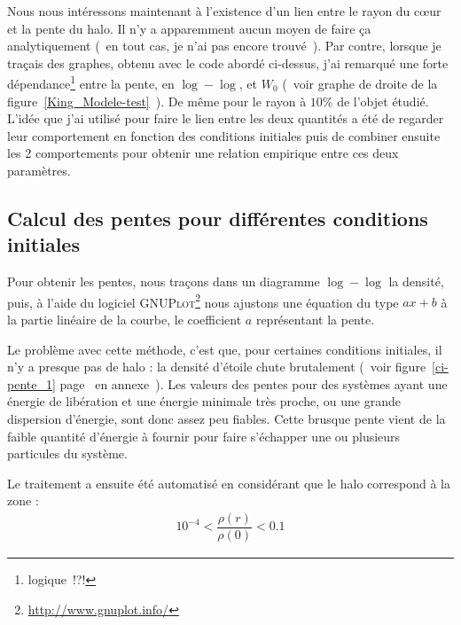 	Nous nous intéressons maintenant à l'existence d'un lien entre le rayon du cœur et la pente
du halo. Il n'y a apparemment aucun moyen de faire ça analytiquement (~en tout cas, je n'ai pas encore trouvé~).
Par contre, lorsque je traçais des graphes, obtenu avec le code abordé ci-dessus,
j'ai remarqué une forte dépendance\footnote{logique~!?!} entre la pente, en $\log-\log$, et $W_0$
(~voir graphe de droite de la figure~\ref{King_Modele-test}~). De même pour le rayon à $10\%$
de l'objet étudié. L'idée que j'ai utilisé pour faire le lien entre les deux quantités a été de
regarder leur comportement en fonction des conditions initiales puis de combiner ensuite les 2
comportements pour obtenir une relation empirique entre ces deux paramètres. %

\subsection{Calcul des pentes pour différentes conditions initiales\label{pente-critére}}

	Pour obtenir les pentes, nous traçons dans un diagramme $\log-\log$ la densité, puis, à l'aide
du logiciel \textsc{GNUPlot}\footnote{\url{http://www.gnuplot.info/}} nous ajustons une équation du type $a x+b$ à la partie linéaire de la
courbe, le coefficient $a$ représentant la pente.

	Le problème avec cette méthode, c'est que, pour certaines conditions initiales, il n'y a
presque pas de halo : la densité d'étoile chute brutalement (~voir figure~\ref{ci-pente_1}
page~\pageref{ci-pente_1} en annexe~). Les valeurs des pentes pour des systèmes ayant une énergie de
libération et une énergie minimale très proche, ou une grande dispersion d'énergie, sont donc assez
peu fiables. Cette brusque pente vient de la faible quantité d'énergie à fournir pour faire
s'échapper une ou plusieurs particules du système.

	Le traitement a ensuite été automatisé en considérant que le halo correspond à la zone :
	\begin{align}
		10^{-4} < \dfrac{\rho(r)}{\rho(0)} < 0.1 \label{pente::critere}
	\end{align}

